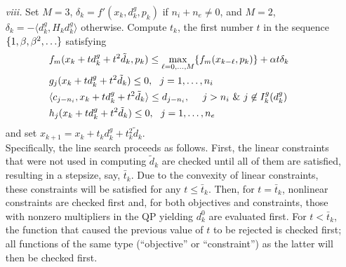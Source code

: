 \begin{itemize}
\item[\it viii.] Set $M=3$, $\delta_k=f'(x_k,d^g_k,p_k)$ if $n_i+n_e\ne 0$,
and $M=2$, $\delta_k=-\langle d^g_k,H_kd^g_k\rangle$ otherwise.
Compute $t_k$, the first number $t$ in 
the sequence $\mbox\{1,\beta,\beta^{2},\ldots\}$ satisfying
\smallskip
\begin{eqnarray*}
\textstyle
& f_m(x_{k}+td^g_k+t^{2}\tilde d_k,p_k)\leq 
 \max\limits_{\ell=0,\ldots,M}\{f_m(x_{k-\ell},p_k)\}+
\alpha t \delta_k &\\
& g_{j}(x_{k}+td_k^g+t^{2}\tilde d_{k})\leq0,~~j=1,\ldots,n_i & \\
&\langle c_{j-n_i},x_k+td_k^g +t^2 \tilde{d}_k \rangle \leq d_{j-n_i},
              ~~~~j>n_i~\&~j\not\in I^g_k(d^g_k) &\\
& h_{j}(x_{k}+td_k^g+t^{2}\tilde d_{k})\leq0,~~j=1,\ldots,n_e &
\end{eqnarray*}
and set $x_{k+1}=x_k+t_kd_k^g+t_k^2\tilde d_k.$ \\
Specifically, the line search proceeds as follows.
First, the linear constraints that were not used
in computing $\tilde{d}_k$ are checked until all of them are
satisfied, resulting in a stepsize, say, $\bar{t}_k$. Due to 
the convexity of linear constraints, these constraints
will be satisfied for any $t\leq \bar{t}_k$. Then, for $t=\bar{t}_k$,
nonlinear constraints are checked first and,
for both objectives and constraints, those with nonzero 
multipliers in the QP yielding $d^0_k$ are evaluated first.
For $t<\bar{t}_k$, the function that caused the previous value of $t$ to
be rejected is checked first; all functions of the same type
(``objective'' or ``constraint'') as the latter
will then be checked first.
\end{itemize}


